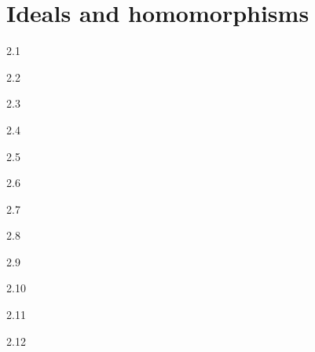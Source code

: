 \chapter{Ideals and homomorphisms}

\begin{solution}{}{2.1}
    
\end{solution}

\begin{solution}{}{2.2}

\end{solution}

\begin{solution}{}{2.3}
    
\end{solution}

\begin{solution}{}{2.4}

\end{solution}

\begin{solution}{}{2.5}
    
\end{solution}

\begin{solution}{}{2.6}

\end{solution}

\begin{solution}{}{2.7}
    
\end{solution}

\begin{solution}{}{2.8}

\end{solution}

\begin{solution}{}{2.9}
    
\end{solution}

\begin{solution}{}{2.10}

\end{solution}

\begin{solution}{}{2.11}
    
\end{solution}

\begin{solution}{}{2.12}

\end{solution}